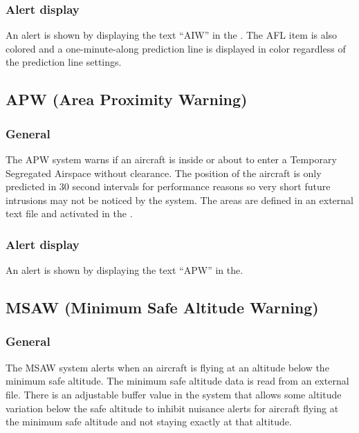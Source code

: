 \documentclass[a4paper,oneside,11pt]{memoir}
\begin{document}
\subsubsection*{Alert display}

An alert is shown by displaying the text “AIW” in the . The AFL item is also colored  and a one-minute-along prediction line is displayed in  color regardless of the prediction line settings.

\subsection{APW (Area Proximity Warning)}
\label{tool:APW}
\subsubsection*{General}

The APW system warns if an aircraft is inside or about to enter a Temporary Segregated Airspace without clearance. The position of the aircraft is only predicted in 30 second intervals for performance reasons so very short future intrusions may not be noticed by the system. The areas are defined in an external text file and activated in the .

\subsubsection*{Alert display}

An alert is shown by displaying the text “APW” in the.

\subsection{MSAW (Minimum Safe Altitude Warning)}
\label{tool:MSAW}
\subsubsection*{General}


The MSAW system alerts when an aircraft is flying at an altitude below the minimum safe altitude. The minimum safe altitude data is read from an external file. There is an adjustable buffer value in the system that allows some altitude variation below the safe altitude to inhibit nuisance alerts for aircraft flying at the minimum safe altitude and not staying exactly at that altitude.
\end{document}
